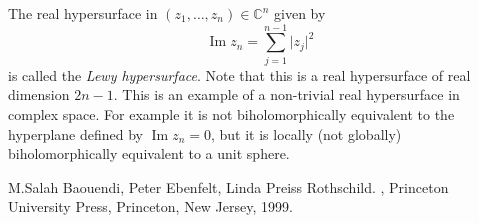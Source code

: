 \documentclass[12pt]{article}
\begin{document}
The real hypersurface in $(z_1,\ldots,z_n) \in {\mathbb{C}}^n$ given by
\begin{equation*}
\operatorname{Im} z_n = \sum_{j=1}^{n-1} \lvert z_j \rvert^2
\end{equation*}
is called the {\em Lewy hypersurface}.  Note that this is a real hypersurface of real dimension $2n-1$.  This is an example of a non-trivial real hypersurface in complex space.  For example it is not biholomorphically equivalent to the hyperplane defined by $\operatorname{Im} z_n = 0$, but it is locally (not globally) biholomorphically equivalent to a unit sphere.


\begin{thebibliography}{9}
M.\@ Salah Baouendi,
Peter Ebenfelt,
Linda Preiss Rothschild.
{\em {}},
Princeton University Press,
Princeton, New Jersey, 1999.
\end{thebibliography}
\end{document}
